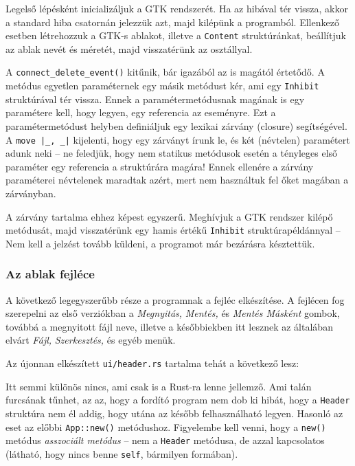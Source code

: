 Legelső lépésként inicializáljuk a GTK rendszerét.
Ha az hibával tér vissza, akkor a standard hiba csatornán jelezzük azt, majd kilépünk a programból.
Ellenkező esetben létrehozzuk a GTK-s ablakot, illetve a \texttt{Content} struktúránkat,
beállítjuk az ablak nevét és méretét, majd visszatérünk az osztállyal.

A \verb+connect_delete_event()+ kitűnik, bár igazából az is magától értetődő.
A metódus egyetlen paraméternek egy másik metódust kér, ami egy \texttt{Inhibit} struktúrával tér vissza.
Ennek a paramétermetódusnak magának is egy paramétere kell, hogy legyen, egy referencia az eseményre.
Ezt a paramétermetódust helyben definiáljuk egy lexikai zárvány (closure) segítségével.
A \verb+move |_, _|+ kijelenti, hogy egy zárványt írunk le, és két (névtelen) paramétert adunk neki --
ne feledjük, hogy nem statikus metódusok esetén a tényleges első paraméter egy referencia a struktúrára magára!
Ennek ellenére a zárvány paraméterei névtelenek maradtak azért, mert nem használtuk fel őket magában a zárványban.

A zárvány tartalma ehhez képest egyszerű.
Meghívjuk a GTK rendszer kilépő metódusát, majd visszatérünk egy hamis értékű \texttt{Inhibit} struktúrapéldánnyal --
Nem kell a jelzést tovább küldeni, a programot már bezárásra késztettük.

\subsubsection{Az ablak fejléce}

A következő legegyszerűbb része a programnak a fejléc elkészítése.
A fejlécen fog szerepelni az első verziókban a \textit{Megnyitás,} \textit{Mentés,} és \textit{Mentés Másként}
gombok, továbbá a megnyitott fájl neve,
illetve a későbbiekben itt lesznek az általában elvárt \textit{Fájl,} \textit{Szerkesztés,} és egyéb menük.

Az újonnan elkészített \texttt{ui/header.rs} tartalma tehát a következő lesz:



Itt semmi különös nincs, ami csak is a Rust-ra lenne jellemző.
Ami talán furcsának tűnhet, az az, hogy a fordító program nem dob ki hibát,
hogy a \texttt{Header} struktúra nem él addig, hogy utána az később felhasználható legyen.
Hasonló az eset az előbbi \texttt{App::new()} metódushoz.
Figyelembe kell venni, hogy a \texttt{new()} metódus \textit{asszociált metódus} --
nem a \texttt{Header} metódusa, de azzal kapcsolatos (látható, hogy nincs benne \texttt{self}, bármilyen formában).

